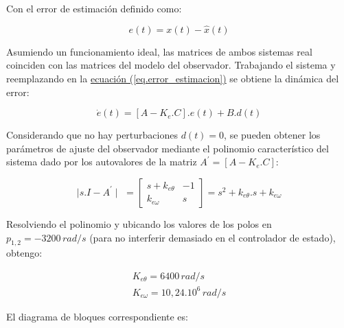 \documentclass{article}
\begin{document}
Con el error de estimación definido como:

\begin{equation}\label{eq.error_estimacion}
    e(t) = x(t) - \hat{x}(t)
\end{equation}

Asumiendo un funcionamiento ideal, las matrices de ambos sistemas real coinciden con las matrices del
modelo del observador. Trabajando el sistema y reemplazando en la   
\hyperref[eq.error_estimacion]{ecuación (\ref*{eq.error_estimacion})}
se obtiene la dinámica del error:

\begin{equation}
    \dot{e}(t) = [A - K_e.C].e(t) + B.d(t)
\end{equation}

Considerando que no hay perturbaciones $d(t) = 0$, se pueden obtener los parámetros de ajuste del observador
mediante el polinomio característico del sistema dado por los autovalores de la matriz 
$A^\prime = [A - K_e.C]$:

\begin{equation}
    \mid s.I - A^\prime\mid \,\,= 
    \begin{bmatrix}
        s + k_{e\theta} & -1 \\
        k_{e\omega} & s 
    \end{bmatrix}
    = s^2 + k_{e\theta}.s + k_{e\omega}
\end{equation}

Resolviendo el polinomio y ubicando los valores de los polos en $p_{1,2} = -3200\, rad/s$ 
(para no interferir demasiado en el controlador de estado), obtengo:

\begin{align*}
    K_{e\theta} = 6400\,rad/s \\
    K_{e\omega} = 10,24.10^6\,rad/s
\end{align*}


El diagrama de bloques correspondiente es:
\end{document}
